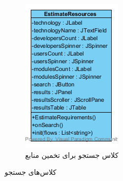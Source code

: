 \begin{figure}[H]
\begin{subfigure}[b]{0.4\textwidth}
		\includegraphics[width=\textwidth]{img/class-design/ui/EstimateResources.png}
		\caption{کلاس جستجو برای تخمین منابع}
	\end{subfigure}
	\caption{کلاس‌های جستجو}
\end{figure}

